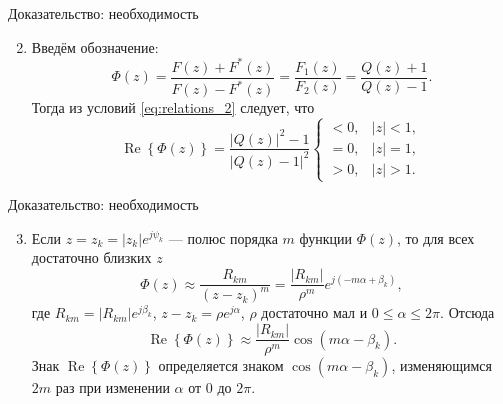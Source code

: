 \documentclass[notheorems,aspectratio=169]{beamer}
\theoremstyle{definition}
\newcommand{\abs}[1]{\left| #1 \right|}
\newcommand{\paren}[1]{\left( #1 \right)}
\renewcommand{\Re}{\operatorname{Re}}
\begin{document}
\begin{frame}{Доказательство: необходимость}
  \begin{enumerate}
    \setcounter{enumi}{1}
  \item Введём обозначение:
    \begin{equation*}
      \Phi(z) = \frac{F(z) + F^*(z)}{F(z) - F^*(z)} = \frac{F_1(z)}{F_2(z)} = \frac{Q(z) + 1}{Q(z) - 1}.
    \end{equation*}
    Тогда из условий \eqref{eq:relations_2} следует, что
    \begin{equation}\label{eq:relations_3}
      \Re \left\{ \Phi(z) \right\} = \frac{\abs{Q(z)}^2 - 1}{\abs{Q(z) - 1}^2}
      \begin{cases}
        < 0, & \abs{z} < 1, \\
        = 0, & \abs{z} = 1, \\
        > 0, & \abs{z} > 1.
      \end{cases}
    \end{equation}
  \end{enumerate}
\end{frame}

\begin{frame}{Доказательство: необходимость}
  \begin{enumerate}
    \setcounter{enumi}{2}
  \item Если $z = z_k = \abs{z_k} e^{j \psi_k}$ --- полюс порядка $m$ функции $\Phi(z)$, то для всех достаточно близких $z$
    \begin{equation*}
      \Phi(z) \approx \frac{R_{km}}{(z - z_k)^m} = \frac{\abs{R_{km}}}{\rho^m} e^{j (-m\alpha + \beta_k)},
    \end{equation*}
    где $R_{km} = \abs{R_{km}} e^{j \beta_k}$, $z - z_k = \rho e^{j\alpha}$, $\rho$ достаточно мал и $0 \leqslant \alpha \leqslant 2\pi$.
    Отсюда
    \begin{equation*}
      \Re \left\{ \Phi(z) \right\} \approx \frac{\abs{R_{km}}}{\rho^m} \cos\paren{m \alpha - \beta_k}.
    \end{equation*}
    Знак $\Re \left\{ \Phi(z) \right\}$ определяется знаком $\cos\paren{m \alpha - \beta_k}$, изменяющимся $2m$ раз
    при изменении $\alpha$ от $0$ до $2\pi$.
  \end{enumerate}
\end{frame}
\end{document}
